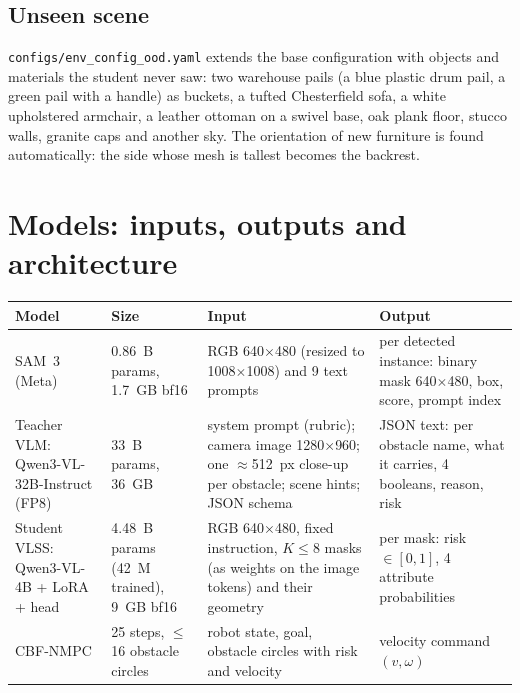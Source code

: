 \documentclass[10pt,a4paper]{article}
\newcommand{\code}[1]{\texttt{#1}}
\begin{document}
\subsection{Unseen scene}
\code{configs/env\_config\_ood.yaml} extends the base configuration with objects and materials the student never saw: two warehouse
pails (a blue plastic drum pail, a green pail with a handle) as buckets, a tufted Chesterfield sofa, a white upholstered armchair,
a leather ottoman on a swivel base, oak plank floor, stucco walls, granite caps and another sky. The orientation of new furniture
is found automatically: the side whose mesh is tallest becomes the backrest.

\section{Models: inputs, outputs and architecture}

\begin{center}\small
\begin{tabularx}{\textwidth}{l>{\raggedright}p{2.9cm}>{\raggedright}X>{\raggedright\arraybackslash}X}
\toprule
Model & Size & Input & Output \\
\midrule
SAM~3 (Meta) & 0.86~B params, 1.7~GB bf16 & RGB 640$\times$480 (resized to 1008$\times$1008) and 9 text prompts & per detected instance: binary mask 640$\times$480, box, score, prompt index \\
\addlinespace
Teacher VLM: Qwen3-VL-32B-Instruct (FP8) & 33~B params, 36~GB & system prompt (rubric); camera image 1280$\times$960; one $\approx$512~px close-up per obstacle; scene hints; JSON schema & JSON text: per obstacle name, what it carries, 4 booleans, reason, risk \\
\addlinespace
Student VLSS: Qwen3-VL-4B + LoRA + head & 4.48~B params (42~M trained), 9~GB bf16 & RGB 640$\times$480, fixed instruction, $K\le 8$ masks (as weights on the image tokens) and their geometry & per mask: risk $\in[0,1]$, 4 attribute probabilities \\
\addlinespace
CBF-NMPC & 25 steps, $\leq$16 obstacle circles & robot state, goal, obstacle circles with risk and velocity & velocity command $(v,\omega)$ \\
\bottomrule
\end{tabularx}
\end{center}

\end{document}
